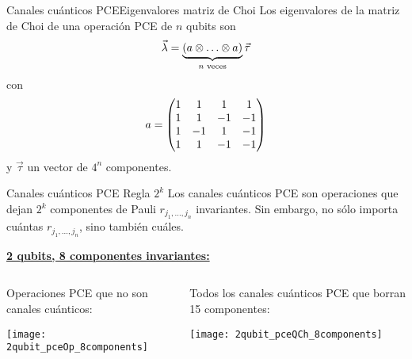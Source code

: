 \documentclass[xcolor=dvipsnames,presentation]{beamer}%
\begin{document}
\begin{frame}{Canales cuánticos PCE}{Eigenvalores matriz de Choi} 
Los eigenvalores de la matriz de Choi de una operación PCE 
de $n$ qubits son
\begin{align*}
\vec{\lambda} = 
\underbrace{\qty(a\otimes \ldots\otimes a)}_{n\text{ veces}} \vec{\tau}
\end{align*}
con
\begin{align*}
a=\mqty(1&1&1&1\\1&1&-1&-1\\1&-1&1&-1\\1&1&-1&-1)
\end{align*}
y $\vec{\tau}$ un vector de $4^n$ componentes.
\end{frame}


\begin{frame}{Canales cuánticos PCE}
{Regla $2^k$}
Los canales cuánticos PCE son operaciones que dejan $2^k$ 
componentes de Pauli $r_{j_1,\ldots,j_n}$ invariantes. Sin embargo, 
no sólo importa cuántas $r_{j_1,\ldots,j_n}$, sino también cuáles. 

\vspace{.6cm}

\small{\textbf{\underline{2 qubits, 8 componentes invariantes:}}}

\vspace{.2cm}

\small{
\begin{columns}
\begin{column}{0.5\textwidth}
\hspace{.3cm}
Operaciones PCE que no son\newline
\hspace{.3cm}
canales cuánticos:
\vspace{.1cm}
\begin{center}
\texttt{[image: 2qubit\_pceOp\_8components]}
\end{center}
\vspace{1.6cm}
\end{column} 
\begin{column}{0.5\textwidth}
Todos los canales cuánticos PCE que borran 15 componentes:
\begin{center}
\texttt{[image: 2qubit\_pceQCh\_8components]}
\end{center}
\end{column}
\end{columns}}
\vspace{2cm}
\end{frame}
\end{document}
